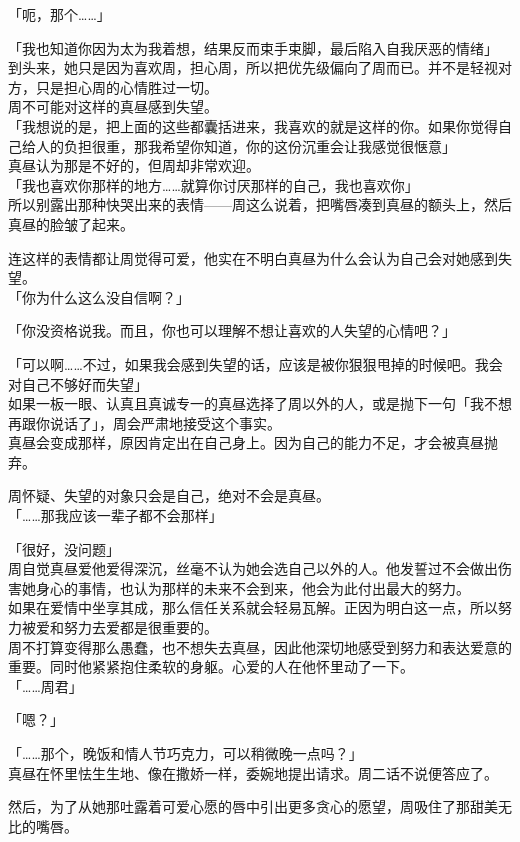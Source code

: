 「呃，那个……」

「我也知道你因为太为我着想，结果反而束手束脚，最后陷入自我厌恶的情绪」\\

到头来，她只是因为喜欢周，担心周，所以把优先级偏向了周而已。并不是轻视对方，只是担心周的心情胜过一切。\\

周不可能对这样的真昼感到失望。\\

「我想说的是，把上面的这些都囊括进来，我喜欢的就是这样的你。如果你觉得自己给人的负担很重，那我希望你知道，你的这份沉重会让我感觉很惬意」\\

真昼认为那是不好的，但周却非常欢迎。\\

「我也喜欢你那样的地方……就算你讨厌那样的自己，我也喜欢你」\\

所以别露出那种快哭出来的表情——周这么说着，把嘴唇凑到真昼的额头上，然后真昼的脸皱了起来。

连这样的表情都让周觉得可爱，他实在不明白真昼为什么会认为自己会对她感到失望。\\

「你为什么这么没自信啊？」

「你没资格说我。而且，你也可以理解不想让喜欢的人失望的心情吧？」

「可以啊……不过，如果我会感到失望的话，应该是被你狠狠甩掉的时候吧。我会对自己不够好而失望」\\

如果一板一眼、认真且真诚专一的真昼选择了周以外的人，或是抛下一句「我不想再跟你说话了」，周会严肃地接受这个事实。\\

真昼会变成那样，原因肯定出在自己身上。因为自己的能力不足，才会被真昼抛弃。

周怀疑、失望的对象只会是自己，绝对不会是真昼。\\

「……那我应该一辈子都不会那样」

「很好，没问题」\\

周自觉真昼爱他爱得深沉，丝毫不认为她会选自己以外的人。他发誓过不会做出伤害她身心的事情，也认为那样的未来不会到来，他会为此付出最大的努力。\\

如果在爱情中坐享其成，那么信任关系就会轻易瓦解。正因为明白这一点，所以努力被爱和努力去爱都是很重要的。\\

周不打算变得那么愚蠢，也不想失去真昼，因此他深切地感受到努力和表达爱意的重要。同时他紧紧抱住柔软的身躯。心爱的人在他怀里动了一下。\\

「……周君」

「嗯？」

「……那个，晚饭和情人节巧克力，可以稍微晚一点吗？」\\

真昼在怀里怯生生地、像在撒娇一样，委婉地提出请求。周二话不说便答应了。

然后，为了从她那吐露着可爱心愿的唇中引出更多贪心的愿望，周吸住了那甜美无比的嘴唇。
